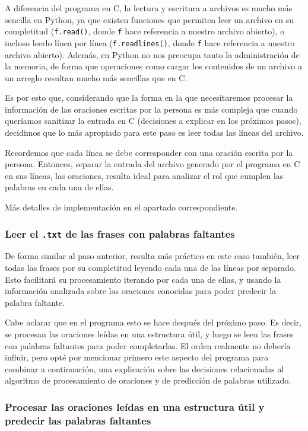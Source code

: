 \documentclass[a4paper]{article}
\begin{document}
A diferencia del programa en C, la lectura y escritura a archivos es mucho más sencilla en Python, ya que existen funciones que permiten leer un archivo en su completitud (\texttt{f.read()}, donde \texttt{f} hace referencia a nuestro archivo abierto), o incluso leerlo línea por línea (\texttt{f.readlines()}, donde \texttt{f} hace referencia a nuestro archivo abierto). Además, en Python no nos preocupa tanto la administración de la memoria, de forma que operaciones como cargar los contenidos de un archivo a un arreglo resultan mucho más sencillas que en C.

Es por esto que, considerando que la forma en la que necesitaremos procesar la información de las oraciones escritas por la persona es más compleja que cuando queríamos sanitizar la entrada en C (decisiones a explicar en los próximos pasos), decidimos que lo más apropiado para este paso es leer todas las líneas del archivo.

Recordemos que cada línea se debe corresponder con una oración escrita por la persona. Entonces, separar la entrada del archivo generado por el programa en C en sus líneas, las oraciones, resulta ideal para analizar el rol que cumplen las palabras en cada una de ellas.

Más detalles de implementación en el apartado correspondiente.

\subsubsection{Leer el \texttt{.txt} de las frases con palabras faltantes}

De forma similar al paso anterior, resulta más práctico en este caso también, leer todas las frases por su completitud leyendo cada una de las líneas por separado. Esto facilitará su procesamiento iterando por cada una de ellas, y usando la información analizada sobre las oraciones conocidas para poder predecir la palabra faltante.

Cabe aclarar que en el programa esto se hace después del próximo paso. Es decir, se procesan las oraciones leídas en una estructura útil, y luego se leen las frases con palabras faltantes para poder completarlas. El orden realmente no debería influir, pero opté por mencionar primero este aspecto del programa para combinar a continuación, una explicación sobre las decisiones relacionadas al algoritmo de procesamiento de oraciones y de predicción de palabras utilizado.

\subsubsection{Procesar las oraciones leídas en una estructura útil y predecir las palabras faltantes}
\end{document}
